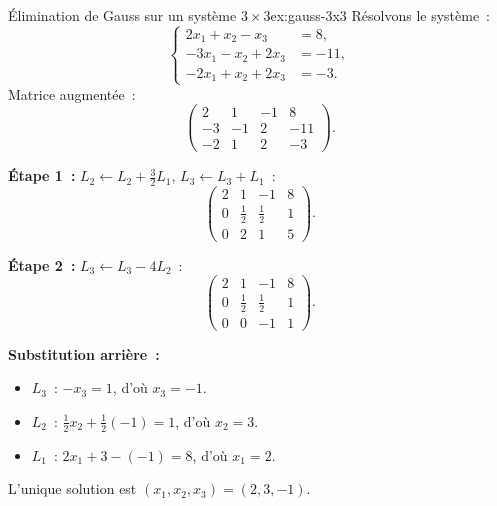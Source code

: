 \begin{example}{Élimination de Gauss sur un système $3\times 3$}{ex:gauss-3x3}
  Résolvons le système~:
  \[
    \left\{
    \begin{aligned}
      2x_1 + x_2 - x_3 &= 8,\\
      -3x_1 - x_2 + 2x_3 &= -11,\\
      -2x_1 + x_2 + 2x_3 &= -3.
    \end{aligned}
    \right.
  \]
  Matrice augmentée~:
  \[
    \left(\begin{array}{ccc|c}
      2 & 1 & -1 & 8\\
      -3 & -1 & 2 & -11\\
      -2 & 1 & 2 & -3
    \end{array}\right).
  \]

  \textbf{Étape 1~:} $L_2\leftarrow L_2+\frac{3}{2}L_1$,\quad
  $L_3\leftarrow L_3+L_1$~:
  \[
    \left(\begin{array}{ccc|c}
      2 & 1 & -1 & 8\\[3pt]
      0 & \frac{1}{2} & \frac{1}{2} & 1\\[3pt]
      0 & 2 & 1 & 5
    \end{array}\right).
  \]

  \textbf{Étape 2~:} $L_3\leftarrow L_3-4L_2$~:
  \[
    \left(\begin{array}{ccc|c}
      2 & 1 & -1 & 8\\[3pt]
      0 & \frac{1}{2} & \frac{1}{2} & 1\\[3pt]
      0 & 0 & -1 & 1
    \end{array}\right).
  \]

  \textbf{Substitution arrière~:}
  \begin{itemize}
    \item $L_3$~: $-x_3=1$, d'où $x_3=-1$.
    \item $L_2$~: $\frac{1}{2}x_2+\frac{1}{2}(-1)=1$, d'où $x_2=3$.
    \item $L_1$~: $2x_1+3-(-1)=8$, d'où $x_1=2$.
  \end{itemize}
  L'unique solution est $(x_1,x_2,x_3)=(2,3,-1)$.
\end{example}

